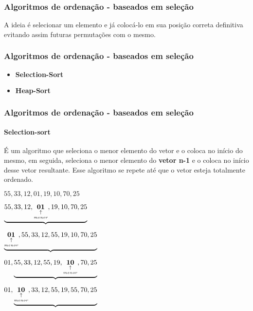 \begin{frame}
	\frametitle{Algoritmos de ordenação - baseados em seleção}
	\par A ideia é selecionar um elemento e já colocá-lo em sua posição correta definitiva evitando assim futuras permutações com o mesmo.
\end{frame}

\begin{frame}
	\frametitle{Algoritmos de ordenação - baseados em seleção}
	\begin{itemize}
		\item \textbf{Selection-Sort}
		\item \textbf{Heap-Sort}
	\end{itemize}
\end{frame}

\begin{frame}
	\frametitle{Algoritmos de ordenação - baseados em seleção}
	\framesubtitle{Selection-sort}
	\par É um algoritmo que seleciona o menor elemento do vetor e o coloca no início do mesmo, em seguida, seleciona o menor elemento do \textbf{vetor n-1} e o coloca no início desse vetor resultante. Esse algoritmo se repete até que o vetor esteja totalmente ordenado. 
	
	\par $55,33,12,01,19,10,70,25$	
	\par $\underbrace{55,33,12,\underset{\underset{menor}{\uparrow}}{\mathbf{01}},19,10,70,25}$
	\pause
	\par $\underbrace{\underset{\underset{menor}{\uparrow}}{\mathbf{01}},55,33,12,55,19,10,70,25}$
	\pause
	\par $01,\underbrace{55,33,12,55,19,\underset{\underset{menor}{\uparrow}}{\mathbf{10}},70,25}$
	\pause
	\par $01,\underbrace{\underset{\underset{menor}{\uparrow}}{\mathbf{10}},33,12,55,19,55,70,25}$
\end{frame}

